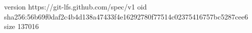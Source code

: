 version https://git-lfs.github.com/spec/v1
oid sha256:56b69f0daf2c4b4d138a47433f4e16292780f77514c02375416757bc5287cee6
size 137016
